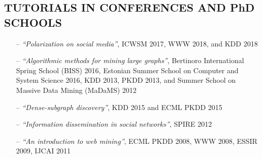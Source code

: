 \documentclass[a4paper,11pt]{res}
\begin{document}
\begin{resume}
\section{{\small TUTORIALS IN CONFERENCES AND PhD SCHOOLS}}
\begin{itemize}
\setlength{\itemsep}{0pt}
\item [--]
{\em ``Polarization on social media''}, 
ICWSM 2017, WWW 2018, and KDD 2018
\item [--]
{\em ``Algorithmic methods for mining large graphs''}, 
Bertinoro International Spring School (BISS) 2016,
Estonian Summer School on Computer and System Science 2016, 
KDD 2013, PKDD 2013, and Summer School on Massive Data Mining (MaDaMS) 2012
\item [--]
{\em ``Dense-subgraph discovery''}, KDD 2015 and ECML PKDD 2015
\item [--]
{\em ``Information dissemination in social networks''}, SPIRE 2012
\item [--]
{\em ``An introduction to web mining''}, ECML PKDD 2008,  WWW 2008, ESSIR 2009, IJCAI 2011
\iffalse
\item[--]
{\em ``Mining the graph structures of the web''},
summer school on Algorithmic Data Analysis (SADA) 
{2007}
\item[--]
{\em ``Segmentation of sequences''},
SIAM Conference in Data Mining, 2005 
\fi
\end{itemize}


\end{resume}
\end{document}
